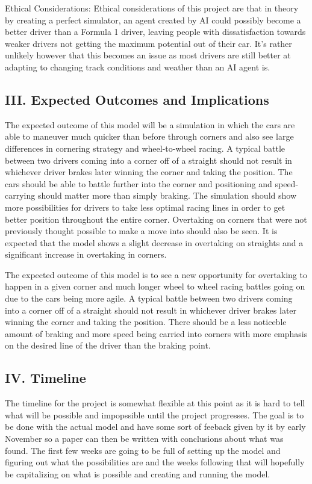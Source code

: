\documentclass[11pt]{article} %
\begin{document}
Ethical Considerations: Ethical considerations of this project are that in theory by creating a perfect simulator, an agent created by AI could possibly become a better driver than a Formula 1 driver, leaving people with dissatisfaction towards weaker drivers not getting the maximum potential out of their car. It's rather unlikely however that this becomes an issue as most drivers are still better at adapting to changing track conditions and weather than an AI agent is.


\subsection{III. Expected Outcomes and Implications}

The expected outcome of this model will be a simulation in which the cars are able to maneuver much quicker than before through corners and also see large differences in cornering strategy and wheel-to-wheel racing. A typical battle between two drivers coming into a corner off of a straight should not result in whichever driver brakes later winning the corner and taking the position. The cars should be able to battle further into the corner and positioning and speed-carrying should matter more than simply braking. The simulation should show more possibilities for drivers to take less optimal racing lines in order to get better position throughout the entire corner. Overtaking on corners that were not previously thought possible to make a move into should also be seen. It is expected that the model shows a slight decrease in overtaking on straights and a significant increase in overtaking in corners.

The expected outcome of this model is to see a new opportunity for overtaking to happen in a given corner and much longer wheel to wheel racing battles going on due to the cars being more agile. A typical battle between two drivers coming into a corner off of a straight should not result in whichever driver brakes later winning the corner and taking the position. There should be a less noticeble amount of braking and more speed being carried into corners with more emphasis on the desired line of the driver than the braking point. 

\subsection {IV. Timeline}

The timeline for the project is somewhat flexible at this point as it is hard to tell what will be possible and impopssible until the project progresses. The goal is to be done with the actual model and have some sort of feeback given by it by early November so a paper can then be written with conclusions about what was found. The first few weeks are going to be full of setting up the model and figuring out what the possibilities are and the weeks following that will hopefully be capitalizing on what is possible and creating and running the model.
\end{document}
